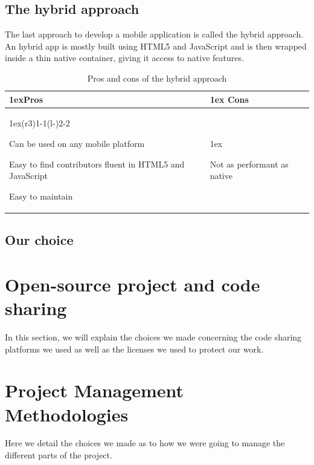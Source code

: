 \documentclass[11pt, a4paper]{report}
\begin{document}
\subsection{The hybrid approach}

The last approach to develop a mobile application is called the hybrid approach. An hybrid app is mostly built using HTML5 and JavaScript and is then wrapped inside a thin native container, giving it access to native features.

\begin{table}[H]
\begin{tabularx}{\linewidth}{>{\parskip1ex}X@{\kern4\tabcolsep}>{\parskip1ex}X}
\toprule
\hfil\bfseries Pros
&
\hfil\bfseries Cons
\\\cmidrule(r{3\tabcolsep}){1-1}\cmidrule(l{-\tabcolsep}){2-2}

Can be used on any mobile platform\par
Easy to find contributors fluent in HTML5 and JavaScript\par
Easy to maintain\par

&

Not as performant as native\par



\\\bottomrule
\end{tabularx}
\caption{Pros and cons of the hybrid approach}
\end{table}

\subsection{Our choice}

\section{Open-source project and code sharing}

In this section, we will explain the choices we made concerning the code sharing platforms we used as well as the licenses we used to protect our work.

\section{Project Management Methodologies}

Here we detail the choices we made as to how we were going to manage the different parts of the project.
\end{document}
